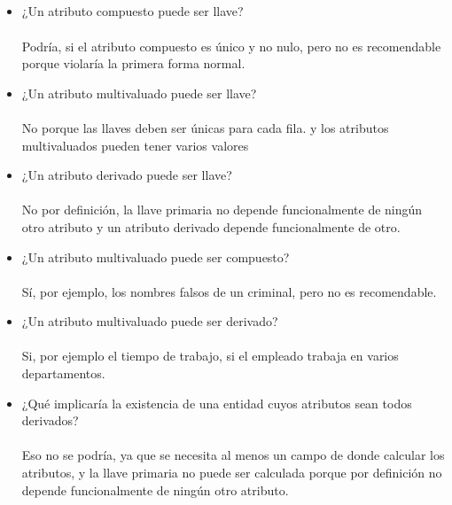 \documentclass{article}
\begin{document}
\subsection{}
\begin{itemize}
    \item ¿Un atributo compuesto puede ser llave?\\\\
    Podría, si el atributo compuesto es único y no nulo, pero no es recomendable porque violaría la primera forma normal.
    \item ¿Un atributo multivaluado puede ser llave?\\\\
    No porque las llaves deben ser únicas para cada fila. y los atributos multivaluados pueden tener varios valores
    \item ¿Un atributo
    derivado puede ser llave?
    \\\\No por definición, la llave primaria no depende funcionalmente de ningún otro atributo y un atributo derivado depende funcionalmente de otro.
    \item ¿Un atributo multivaluado puede ser compuesto?\\\\Sí, por ejemplo, los nombres falsos de un criminal, pero no es recomendable.
    \item ¿Un atributo multivaluado puede ser derivado? \\\\Si, por ejemplo el tiempo de trabajo, si el empleado trabaja en varios departamentos.
    \item ¿Qué implicaría la existencia de una entidad cuyos atributos sean todos derivados?
    \\\\Eso no se podría, ya que se necesita al menos un campo de donde calcular los atributos, y la llave primaria no puede ser calculada porque por definición no depende funcionalmente de ningún otro atributo.
\end{itemize}
\end{document}

